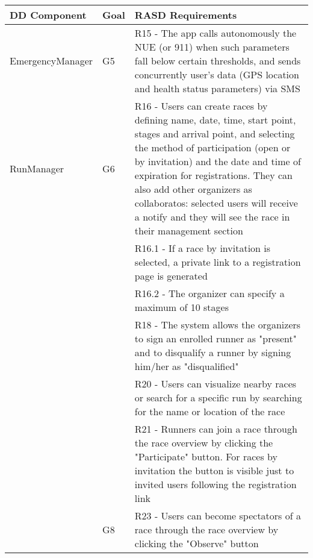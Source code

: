 \begin{table}[]
\begin{adjustbox}{width=\textwidth}
\begin{tabular}{|p{}|p{}|p{}|}
\hline
\textbf{DD Component} & \textbf{Goal} & \textbf{RASD Requirements}\\ \hline

EmergencyManager	& G5	& R15 -	The app calls autonomously the NUE (or 911) when such parameters fall below certain thresholds, and sends concurrently user's data (GPS location and health status parameters) via SMS\\ \hline
RunManager			& G6	& R16 -	Users can create races by defining name, date, time, start point, stages and arrival point, and selecting the method of participation (open or by invitation) and the date and time of expiration for registrations. They can also add other organizers as collaboratos: selected users will receive a notify and they will see the race in their management section\\
					&		& R16.1 - If a race by invitation is selected, a private link to a registration page is generated\\
					&		& R16.2	- The organizer can specify a maximum of 10 stages\\
					&		& R18 -	The system allows the organizers to sign an enrolled runner as "present" and to disqualify a runner by signing him/her as "disqualified"\\
					&		& R20 -	Users can visualize nearby races or search for a specific run by searching for the name or location of the race\\
					&		& R21 -	Runners can join a race through the race overview by clicking the "Participate" button. For races by invitation the button is visible just to invited users following the registration link\\
					& G8	& R23 -	Users can become spectators of a race through the race overview by clicking the "Observe" button\\ \hline

\end{tabular}
\end{adjustbox}
\end{table}


